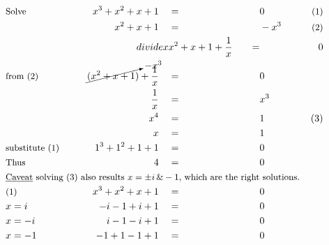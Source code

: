\begin{alignat*}{7}
&\small{\text{Solve}}&x^3+x^2+x+1\quad&=\quad&&0&\small\text{(1)}\\
&\,&x^2+x+1\quad&=&&-x^3\qquad&\small\text{(2)}\\
&\small &divide x&x^2+x+1+\frac{1}{x}\quad&=&&0\\
&\small\text{from (2)}&\cancelto{-x^3}{(x^2+x+1)}+\frac{1}{x}\quad&=&&0\\
&\,&\frac{1}{x}\quad&=&&x^3\\
&\,&x^4\quad&=&&1&\small{(3)}\\
&\,&x\quad&=&&1\\
&\small\text{substitute (1)}\qquad&1^3+1^2+1+1\quad&=&&0\\
&\small\text{Thus}&4\quad&=&&0\\
&\rlap{\small\rm\underline{Caveat}\text{ solving (3) also results $x=\pm i\,\&-1$, which are the right solutions.}}\\
&\small\text{(1)}&x^3+x^2+x+1\quad&=\quad&&0\\
&\small x=i&-i-1+i+1\quad&=&&0\\
&\small x=-i\qquad&i-1-i+1\quad&=&&0\\
&\small x=-1&-1+1-1+1\quad&=&&0
\end{alignat*}
